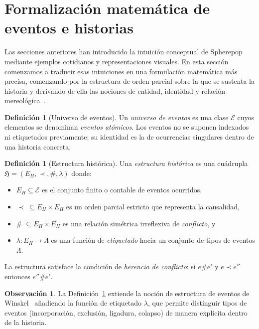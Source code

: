 \documentclass[12pt]{article}
\theoremstyle{plain}
\theoremstyle{definition}
\newtheorem{definition}[theorem]{Definición}
\newtheorem{remark}[theorem]{Observación}
\begin{document}
\section{Formalización matemática de eventos e historias}
\label{sec:formalizacion}

Las secciones anteriores han introducido la intuición conceptual de Spherepop mediante ejemplos cotidianos y representaciones visuales. En esta sección comenzamos a traducir esas intuiciones en una formulación matemática más precisa, comenzando por la estructura de orden parcial sobre la que se sustenta la historia y derivando de ella las nociones de entidad, identidad y relación mereológica~\cite{maclane,awodey,winskel}.

\begin{definition}[Universo de eventos]
\label{def:universo}
Un \emph{universo de eventos} es una clase $\mathcal{E}$ cuyos elementos se denominan \emph{eventos atómicos}. Los eventos no se suponen indexados ni etiquetados previamente; su identidad es la de ocurrencias singulares dentro de una historia concreta.
\end{definition}

\begin{definition}[Estructura histórica]
\label{def:estructura}
Una \emph{estructura histórica} es una cuádrupla $\mathfrak{H} = (E_H, \prec, \#, \lambda)$ donde:
\begin{itemize}
\item[] $E_H \subseteq \mathcal{E}$ es el conjunto finito o contable de eventos ocurridos,
\item[] $\prec\;\subseteq E_H \times E_H$ es un orden parcial estricto que representa la causalidad,
\item[] $\#\;\subseteq E_H \times E_H$ es una relación simétrica irreflexiva de \emph{conflicto}, y
\item[] $\lambda: E_H \to \Lambda$ es una función de \emph{etiquetado} hacia un conjunto de tipos de eventos $\Lambda$.
\end{itemize}
La estructura satisface la condición de \emph{herencia de conflicto}: si $e \# e'$ y $e \prec e''$ entonces $e'' \# e'$.
\end{definition}

\begin{remark}
La Definición~\ref{def:estructura} extiende la noción de estructura de eventos de Winskel~\cite{winskel} añadiendo la función de etiquetado $\lambda$, que permite distinguir tipos de eventos (incorporación, exclusión, ligadura, colapso) de manera explícita dentro de la historia.
\end{remark}
\end{document}
